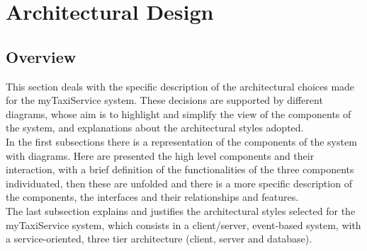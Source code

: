 

%

\newpage
	\section{Architectural Design}
		\subsection{Overview}
			This section deals with the specific description of the architectural choices made for the myTaxiService system. These decisions are supported by different diagrams, whose aim is to highlight and simplify the view of the components of the system, and explanations about the architectural styles adopted.
			\\In the first subsections there is a representation of the components of the system with diagrams. Here are presented the high level components and their interaction, with a brief definition of the functionalities of the three components individuated, then these are unfolded and there is a more specific description of the components, the interfaces and their relationships and features.\\
			The last subsection explains and justifies the architectural styles selected for the myTaxiService system, which consists in a client/server, event-based system, with a service-oriented, three tier architecture (client, server and database). 
			
	
\newpage
